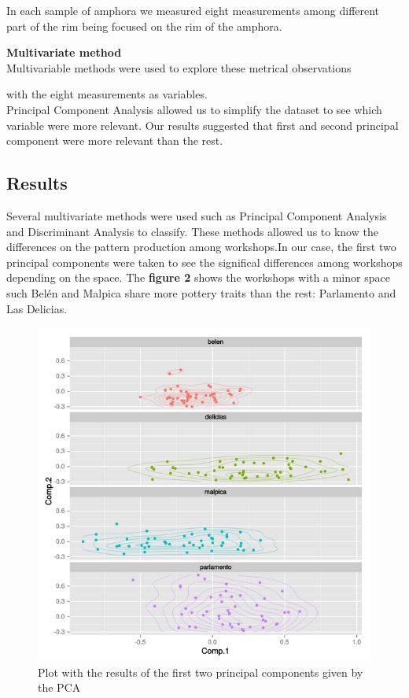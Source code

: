\documentclass[a4paper]{article}
\begin{document}
In each sample of amphora we measured eight measurements among different part of the rim being focused on the rim of the amphora.

{\textbf{Multivariate method}} \\

Multivariable methods were used to explore these metrical observations \cite{li}

with the eight measurements as variables.\\ 
Principal Component Analysis allowed us to simplify the dataset to see which variable were more relevant. 
Our results suggested that first and second principal component were more relevant than the rest. 
\subsection{Results}

Several multivariate methods were used such as Principal Component Analysis and Discriminant Analysis to classify. These methods allowed us to know the differences on the pattern production among workshops.In our case, the first two principal components were taken to see the significal differences among workshops depending on the space. The \textbf{figure 2} shows the workshops with a minor space such Bel\'en and Malpica share more pottery traits than the rest: Parlamento and Las Delicias.

\begin{figure}
    \centering
\includegraphics[width=0.7\linewidth]{images/fig2.png}
\caption{Plot with the results of the first two principal components given by the PCA}
\end{figure}
\end{document}

